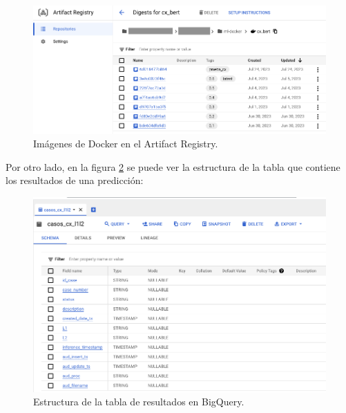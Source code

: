\begin{figure}[H]
	\centering
	\includegraphics[width=1\textwidth]{./Figures/cap4-ar.png}
	\caption{Imágenes de Docker en el Artifact Registry.}
	\label{fig:cap4-ar}
\end{figure}

Por otro lado, en la figura \ref{fig:cap4-bq} se puede ver la estructura de la tabla que contiene los resultados de una predicción:

\begin{figure}[htbp]
	\centering
	\includegraphics[width=1\textwidth]{./Figures/cap4-bq.png}
	\caption{Estructura de la tabla de resultados en BigQuery.}
	\label{fig:cap4-bq}
\end{figure}

